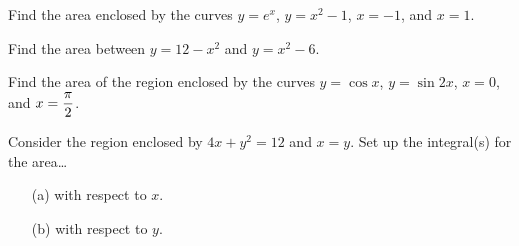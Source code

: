 \documentclass[12pt]{article}
\begin{document}
\newpage

\Example Find the area enclosed by the curves $y=e^x$, $y=x^2-1$, $x=-1$, and $x=1$.

\vspace{100mm}

\Example Find the area between $y=12-x^2$ and $y=x^2-6$.

\newpage

\Example Find the area of the region enclosed by the curves $y=\cos x$, $y=\sin 2x$, $x=0$, and $x=\displaystyle\frac{\pi}{2}$.

\vspace{60mm}

\Example Consider the region enclosed by $4x+y^2=12$ and $x=y$. Set up the integral(s) for the area\dots

\begin{enumerate}
\item[(a)] with respect to $x$.

\vspace{60mm}

\item[(b)] with respect to $y$.
\end{enumerate}
\end{document}
